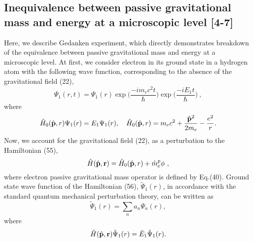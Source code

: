 \documentclass{ws-ijmpd}
\begin{document}
\subsection{Inequivalence between passive gravitational mass
and energy at a microscopic level [4-7]}

Here, we describe Gedanken experiment, which directly
demonstrates breakdown of the equivalence between passive
gravitational mass and energy at a microscopic level.
At first, we consider electron in its ground state  in a hydrogen
 atom with the following wave function, corresponding
to the absence of the gravitational field (22),
\begin{equation}
\Psi_1(r,t) = \Psi_1(r) \exp \biggl( \frac{-im_ec^2t}{\hbar}
\biggl) \exp \biggl( \frac{- iE_1t}{\hbar} \biggl)\ ,
\end{equation}
where
\begin{equation}
\hat H_0(\hat {\bf p},r) \Psi_1(r) = E_1 \Psi_1(r) , \ \ \ \hat
H_0(\hat {\bf p},r)= m_ec^2 + \frac{\hat {\bf p}^2}{2 m_e}-
\frac{e^2}{r}.
\end{equation}
Now, we account for the gravitational field (22), as a
perturbation to the Hamiltonian (55),
\begin{equation}
\hat H(\hat {\bf p},{\bf r}) = \hat H_0(\hat {\bf p},r) + \hat m^p_e \phi \ ,
\end{equation}
where electron passive gravitational mass operator is defined by
Eq.(40). Ground state wave function of the Hamiltonian (56),
$\tilde \Psi_1(r)$, in accordance with the standard quantum
mechanical perturbation theory, can be written as
\begin{equation}
\tilde \Psi_1(r) = \sum_n a_n \Psi_n(r) ,
\end{equation}
where
\begin{equation}
\hat H(\hat {\bf p},{\bf r}) \tilde \Psi_1(r) = \tilde E_1 \tilde
\Psi_1(r).
\end{equation}
\end{document}
